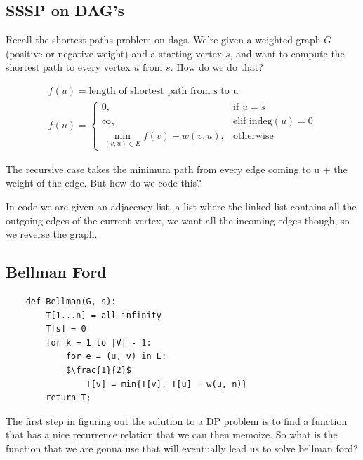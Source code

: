 \documentclass[12pt]{article}
\begin{document}
\subsection{SSSP on DAG's}
Recall the shortest paths problem on dags. We're given a weighted graph $G$ (positive or negative weight)  and a starting vertex $s$, and want to compute the shortest path to every vertex $u$ from $s$. How do we do that?

\begin{align*}
    f(u) = \text{length of shortest path from s to u} \\
    f(u) = \begin{cases}
               0,                                          & \text{if } u = s         \\
               \infty,                                     & \text{elif indeg}(u) = 0 \\
               \min\limits_{(v, u) \in E}{f(v) + w(v, u)}, & \text{otherwise}
           \end{cases}
\end{align*}

The recursive case takes the minimum path from every edge coming to u + the weight of the edge. But how do we code this?

In code we are given an adjacency list, a list where the linked list contains all the outgoing edges of the current vertex, we want all the incoming edges though, so we reverse the graph.

\subsection{Bellman Ford}
\begin{lstlisting}
    def Bellman(G, s):
        T[1...n] = all infinity
        T[s] = 0
        for k = 1 to |V| - 1:
            for e = (u, v) in E:
            $\frac{1}{2}$
                T[v] = min{T[v], T[u] + w(u, n)}
        return T;
\end{lstlisting}

The first step in figuring out the solution to a DP problem is to find a function that has a nice recurrence relation that we can then memoize. So what is the function that we are gonna use that will eventually lead us to solve bellman ford?
\end{document}
